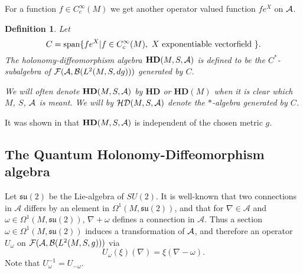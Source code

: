 \documentclass[12pt]{article}
\def\ca{{\cal A}}
\def\cb{{\cal B}}
\def\cd{{\cal D}}
\def\cf{{\cal F}}
\def\ch{{\cal H}}
\newtheorem{definition}[thm]{Definition}
\begin{document}
  
For a function $f\in C^\infty_c (M)$ we get another operator valued function $fe^X$ on $\ca$. 



\begin{definition}
Let 
$$C =   \hbox{span} \{ fe^X |f\in C^\infty_c(M), \ X \hbox{ exponentiable vectorfield }\}  . $$
The holonomy-diffeomorphism algebra $\mathbf{H D} (M,S,\ca)   $ is defined to be the $C^*$-subalgebra of  $\cf (\ca , \cb (L^2(M,S,dg )) )$ generated by $C$.

We will often denote $\mathbf{H D} (M,S,\ca)   $ by $\mathbf{H D}   $ or $\mathbf{H D}  (M)$ when it is clear which $M$, $S$, $\ca$ is meant.
We will by $\ch \cd (M,S,\ca)   $ denote the  $*$-algebra generated by $C$.
\end{definition}

It was shown in \cite{AGnew} that  $\mathbf{H D} (M,S,\ca)   $ is independent of the chosen metric $g$. 










\subsection{The Quantum Holonomy-Diffeomorphism algebra}

Let $\mathfrak{su}(2)$ be the Lie-algebra of $SU(2)$. It is well-known that two connections in $\mathcal{A}$ differs by an element in $\Omega^1(M,\mathfrak{su}(2))$, and that for $\nabla \in \mathcal{A}$ and $\omega \in \Omega^1(M,\mathfrak{su}(2))$, $\nabla +\omega$ defines a connection in $\mathcal{A}$.  Thus  a section $\omega \in \Omega^1(M,\mathfrak{su}(2))$ induces a transformation of $\ca$, and therefore an operator $U_\omega $ on $\mathcal{F}(\ca,  \cb(L^2 (M ,  S,g)))$ via   
$$U_\omega (\xi )(\nabla) = \xi (\nabla - \omega) .$$ 
%
Note that $U^{-1}_\omega=U_{-\omega}$. 
\end{document}
